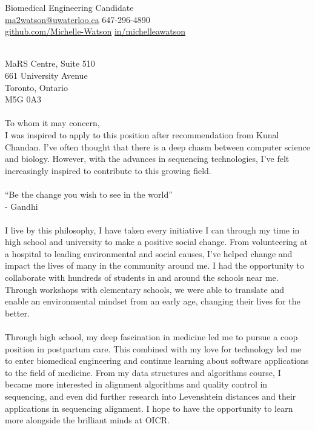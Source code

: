 \documentclass[]{watson-cv}
\begin{document}
%
%

%
%
{ 
Biomedical Engineering Candidate \\
\href{mailto:ma2watson@uwaterloo.ca}{ma2watson@uwaterloo.ca}
\hfill 
647-296-4890\\

\href{http://github.com/Michelle-Watson}{github.com/Michelle-Watson}
\hfill
\href{https://www.linkedin.com/in/michelleawatson}{in/michelleawatson}
}
\begin{minipage}[t]{0.2\textwidth}
\end{minipage}
\begin{minipage}[t]{0.8\textwidth}
\\
\vspace{50}
\large
MaRS Centre, Suite 510 \\
661 University Avenue \\
Toronto, Ontario\\
M5G 0A3\\
\\
To whom it may concern, \\

I was inspired to apply to this position after recommendation from Kunal Chandan. I’ve often thought that there is a deep chasm between computer science and biology. However, with the advances in sequencing technologies, I’ve felt increasingly inspired to contribute to this growing field.\\
\\
“Be the change you wish to see in the world”\\
-	Gandhi\\
\\
I live by this philosophy, I have taken every initiative I can through my time in high school and university to make a positive social change. From volunteering at a hospital to leading environmental and social causes, I’ve helped change and impact the lives of many in the community around me. I had the opportunity to collaborate with hundreds of students in and around the schools near me. Through workshops with elementary schools, we were able to translate and enable an environmental mindset from an early age, changing their lives for the better.\\
\\
Through high school, my deep fascination in medicine led me to pursue a coop position in postpartum care. This combined with my love for technology led me to enter biomedical engineering and continue learning about software applications to the field of medicine. From my data structures and algorithms course, I became more interested in alignment algorithms and quality control in sequencing, and even did further research into Levenshtein distances and their applications in sequencing alignment. I hope to have the opportunity to learn more alongside the brilliant minds at OICR.\\



\end{minipage}
\end{document}
